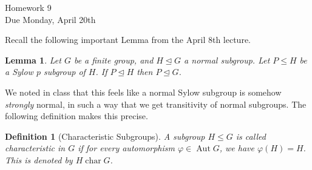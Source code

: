\documentclass[11pt]{article}
\newtheorem{lemma}{Lemma}
\newtheorem{definition}{Definition}
\newcommand{\Aut}{\operatorname{Aut}}
\newcommand{\ch}{\operatorname{char}}
\begin{document}
\begin{center}
\Large {Homework 9}\\
\small {Due Monday, April 20th}
\end{center}
Recall the following important Lemma from the April 8th lecture.
\begin{lemma}\label{LemmaA}
  Let $G$ be a finite group, and $H\unlhd G$ a normal subgroup.  Let $P\le H$ be a Sylow $p$ subgroup of $H$.  If $P\unlhd H$ then $P\unlhd G$.
\end{lemma}
We noted in class that this feels like a normal Sylow subgroup is somehow \textit{strongly} normal, in such a way that we get transitivity of normal subgroups.  The following definition makes this precise.
\begin{definition}[Characteristic Subgroups]
  A subgroup $H\le G$ is called \textit{characteristic} in $G$ if for every automorphism $\varphi\in\Aut G$, we have $\varphi(H) = H$.  This is denoted by $H\ch G$.
\end{definition}
\end{document}
